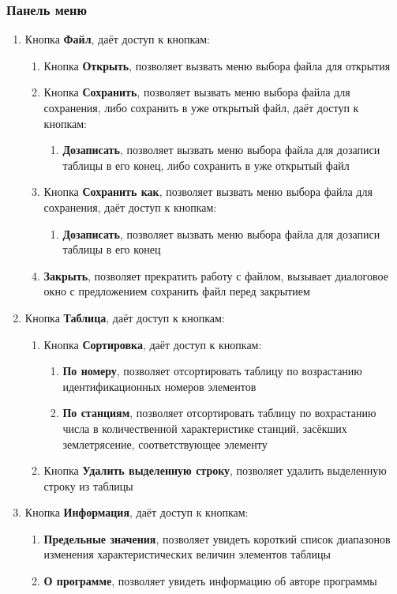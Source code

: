 \documentclass[a4paper,12pt, fleqn]{article}
\theoremstyle{plain} %
\theoremstyle{definition} %
\theoremstyle{remark} %
\numberwithin{equation}{section}
\begin{document}
\subsubsection{Панель меню}
\begin{enumerate}
	\item Кнопка \textbf{Файл}, даёт доступ к кнопкам:
	\begin{enumerate}
		\item Кнопка \textbf{Открыть}, позволяет вызвать меню выбора файла для открытия
		\item Кнопка \textbf{Сохранить}, позволяет вызвать меню выбора файла для сохранения, либо сохранить в уже открытый файл, даёт доступ к кнопкам:
		\begin{enumerate}
			\item \textbf{Дозаписать}, позволяет вызвать меню выбора файла для дозаписи таблицы в его конец, либо сохранить в уже открытый файл
		\end{enumerate}
		\item Кнопка \textbf{Сохранить как}, позволяет вызвать меню выбора файла для сохранения, даёт доступ к кнопкам:
		\begin{enumerate}
			\item \textbf{Дозаписать}, позволяет вызвать меню выбора файла для дозаписи таблицы в его конец
		\end{enumerate}
		\item \textbf{Закрыть}, позволяет прекратить работу с файлом, вызывает диалоговое окно с предложением сохранить файл перед закрытием				
	\end{enumerate}
	\item Кнопка \textbf{Таблица}, даёт доступ к кнопкам:
	\begin{enumerate}
		\item Кнопка \textbf{Сортировка}, даёт доступ к кнопкам:
		\begin{enumerate}
			\item \textbf{По номеру}, позволяет отсортировать таблицу по возрастанию идентификационных номеров элементов
			\item \textbf{По станциям}, позволяет отсортировать таблицу по вохрастанию числа в количественной характеристике станций, засёкших землетрясение, соответствующее элементу			
		\end{enumerate}
		\item Кнопка \textbf{Удалить выделенную строку}, позволяет удалить выделенную строку из таблицы				
	\end{enumerate}
	\item Кнопка \textbf{Информация}, даёт доступ к кнопкам:
	\begin{enumerate}
		\item \textbf{Предельные значения}, позволяет увидеть короткий список диапазонов изменения характеристических величин элементов таблицы
		\item \textbf{О программе}, позволяет увидеть информацию об авторе программы
	\end{enumerate}
\end{enumerate}
\end{document}
